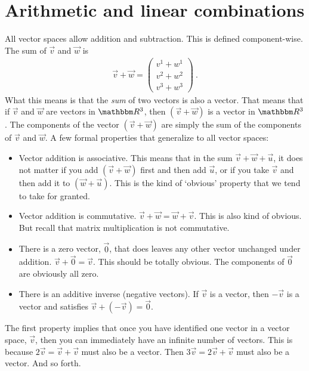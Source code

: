 \section{Arithmetic and linear combinations}

All vector spaces allow addition and subtraction. This is defined component-wise. The sum of $\vec{v}$ and $\vec{w}$ is
\begin{align}
    \vec{v}+\vec{w} = 
    \begin{pmatrix}
        v^1 + w^1\\
        v^2 + w^2\\
        v^3 + w^3
    \end{pmatrix} \ .
\end{align}
What this means is that the \emph{sum} of two vectors is also a vector. That means that if $\vec{v}$ and $\vec{w}$ are vectors in $\RR ^3$, then $(\vec{v}+\vec{w})$ is a vector in $\RR ^3$. The components of the vector $(\vec{v}+\vec{w})$ are simply the sum of the components of $\vec{v}$ and $\vec{w}$. 
% 
A few formal properties that generalize to all vector spaces:
\begin{itemize}
    \item Vector addition is associative. This means that in the sum $\vec{v}+\vec{w}+\vec{u}$, it does not matter if you add $(\vec{v}+\vec{w})$ first and then add $\vec{u}$, or if you take $\vec{v}$ and then add it to $(\vec{w}+\vec{u})$. This is the kind of `obvious' property that we tend to take for granted.
    \item Vector addition is commutative. $\vec{v}+\vec{w} = \vec{w}+\vec{v}$. This is also kind of obvious. But recall that matrix multiplication is not commutative.
    \item There is a zero vector, $\vec{0}$, that does leaves any other vector unchanged under addition. $\vec{v}+\vec{0} = \vec{v}$. This should be totally obvious. The components of $\vec{0}$ are obviously all zero.
    \item There is an additive inverse (negative vectors). If $\vec{v}$ is a vector, then $-\vec{v}$ is a vector and satisfies $\vec{v}+(-\vec{v}) = \vec{0}$.
\end{itemize}
\begin{example}
The first property implies that once you have identified one vector in a vector space, $\vec{v}$, then you can immediately have an infinite number of vectors. This is because $2\vec{v} = \vec{v}+\vec{v}$ must also be a vector. Then $3\vec{v} = 2\vec{v}+\vec{v}$ must also be a vector. And so forth.
\end{example}

